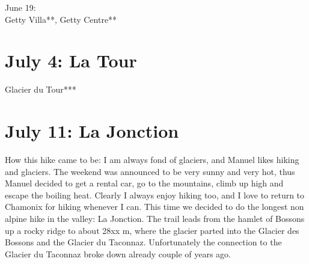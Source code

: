 




June 19:\\
Getty Villa**, Getty Centre**

\section{July 4: La Tour}
\label{LaTour2015}

Glacier du Tour***

\section{July 11: La Jonction}
\label{Jonction2014}

How this hike came to be: I am always fond of glaciers, and Manuel likes hiking and glaciers. The weekend was announced to be very sunny and very hot, thus Manuel decided to get a rental car, go to the mountains, climb up high and escape the boiling heat. Clearly I always enjoy hiking too, and I love to return to Chamonix for hiking whenever I can. This time we decided to do the longest non alpine hike in the valley: La Jonction. The trail leads from the hamlet of Bossons up a rocky ridge to about 28xx m, where the glacier parted into the Glacier des Bossons and the Glacier du Taconnaz. Unfortunately the connection to the Glacier du Taconnaz broke down already couple of years ago.\\

